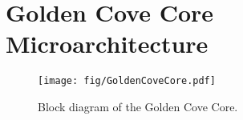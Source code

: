 \chapter{Golden Cove Core Microarchitecture}

\begin{figure}[]
    \centering
    \texttt{[image: fig/GoldenCoveCore.pdf]}
    \caption{Block diagram of the Golden Cove Core.}
\end{figure}